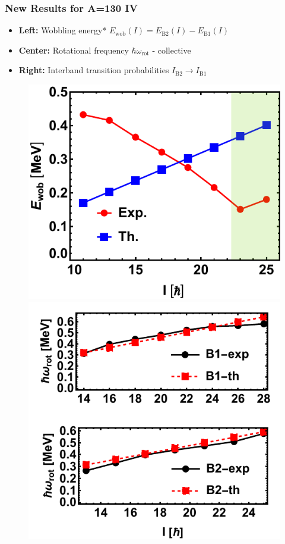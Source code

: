 \documentclass{beamer}
\begin{document}
\begin{frame}
  \frametitle{New Results for A=130 IV}
  \begin{itemize}
    \item \textbf{Left:} Wobbling energy* $E_\text{wob}(I)=E_\text{B2}(I)-E_\text{B1}(I)$
    \item \textbf{Center:} Rotational frequency $\hbar\omega_\text{rot}$ - collective
    \item \textbf{Right:} Interband transition probabilities $I_\text{B2}\to I_\text{B1}$
  \end{itemize}
  \begin{figure}
    \centering
    \includegraphics[scale=0.4]{Figs/ba130-wobbling-energies-edited.pdf}
    \includegraphics[scale=0.36]{Figs/ba130-rotational-frequencies.pdf}

\end{figure}
\end{frame}
\end{document}
